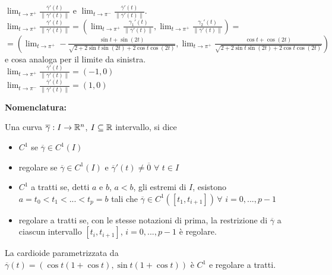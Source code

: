 \begin{exbar}
\begin{example}
	$\lim_{t \rightarrow \pi^+}\frac{\overline{\gamma}'(t)}{\|\overline{\gamma}'(t)\|}$ e $\lim_{t \rightarrow \pi^-}\frac{\overline{\gamma}'(t)}{\|\overline{\gamma}'(t)\|}$.\\
	$\lim_{t \rightarrow \pi^+} \frac{\overline{\gamma}'(t)}{\|\overline{\gamma}'(t)\|}=\left( \lim_{t\rightarrow \pi^+} \frac{\gamma_1'(t)}{\| \overline{\gamma}'(t)\|},\lim_{t\rightarrow \pi^+} \frac{\gamma_2'(t)}{\| \overline{\gamma}'(t) \|} \right)=$\\$=\left( \lim_{t \rightarrow \pi^+} -\frac{\sin t +\sin(2t)}{\sqrt{2+2\sin t \sin(2t)+2\cos t \cos(2t)}}, \lim_{t \rightarrow \pi^+} \frac{\cos t + \cos (2t)}{\sqrt{2+2\sin t \sin(2t)+2\cos t \cos(2t)}}\right)$\\
	e cosa analoga per il limite da sinistra.\\
	$\lim_{t \rightarrow \pi^+}\frac{\overline{\gamma}'(t)}{\|\overline{\gamma}'(t)\|}=(-1,0)$\\
	$\lim_{t \rightarrow \pi^-}\frac{\overline{\gamma}'(t)}{\|\overline{\gamma}'(t)\|}=(1,0)$\\
\end{example}
\end{exbar}


\begin{attbar}
	\textbf{Nomenclatura:}
	
		Una curva $\overline{\gamma}: I \rightarrow \mathbb{R}^n$, $I \subseteq \mathbb{R}$ intervallo, si dice
	\begin{itemize}
		\item $C^1$ se $\overline{\gamma} \in C^1(I)$
		\item regolare se $\overline{\gamma} \in C^1(I)$ e $\overline{\gamma}'(t)\neq \overline{0} \,\, \forall \,\, t \in I$
		\item $C^1$ a tratti se, detti $a$ e $b$, $a < b$, gli estremi di $I$, esistono $a=t_0 <t_1<...<t_p=b$ tali che $\overline{\gamma} \in C^1([t_1,t_{i+1}]) \,\forall\,\, i =0,..., p-1$
		\item regolare a tratti se, con le stesse notazioni di prima, la restrizione di $\overline{\gamma}$ a ciascun intervallo  $[t_i,t_{i+1}]$, $i=0,...,p-1$ è regolare.
	\end{itemize}
\end{attbar}


\begin{exbar}
	La cardioide parametrizzata da $\overline{\gamma}(t)=(\cos t (1+\cos t), \sin t (1+\cos t))$ è $C^1$ e regolare a tratti.
\end{exbar}


